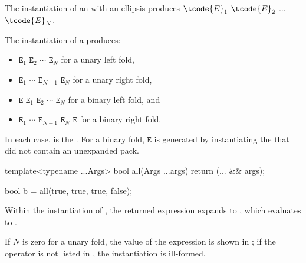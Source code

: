 \pnum
The instantiation of an  with an ellipsis
produces $\tcode{E}_1$ $\tcode{E}_2$ $\dotsc$ $\tcode{E}_N$.

\pnum
The instantiation of a  produces:
\begin{itemize}
\item
\tcode{(}\space
\tcode{((}$\mathtt{E}_1$
            $\mathtt{E}_2$\tcode{)}
            $\cdots$\tcode{)}
            $\mathtt{E}_N$
\space\tcode{)}
for a unary left fold,
\item
\tcode{(}\space
         $\mathtt{E}_1$     
\tcode{(}$\cdots$           
\tcode{(}$\mathtt{E}_{N-1}$ 
         $\mathtt{E}_N$\tcode{))}
\space\tcode{)}
for a unary right fold,
\item
\tcode{(}\space
\tcode{(((}$\mathtt{E}$
             $\mathtt{E}_1$\tcode{)}
             $\mathtt{E}_2$\tcode{)}
             $\cdots$\tcode{)}
             $\mathtt{E}_N$
\space\tcode{)}
for a binary left fold, and
\item
\tcode{(}\space
         $\mathtt{E}_1$     
\tcode{(}$\cdots$           
\tcode{(}$\mathtt{E}_{N-1}$ 
\tcode{(}$\mathtt{E}_{N}$   
         $\mathtt{E}$\tcode{)))}
\space\tcode{)}
for a binary right fold.
\end{itemize}

In each case,
 is the .
For a binary fold,
$\mathtt{E}$ is generated
by instantiating the 
that did not contain an unexpanded pack.
\begin{example}
\begin{codeblock}
template<typename ...Args>
  bool all(Args ...args) { return (... && args); }

bool b = all(true, true, true, false);
\end{codeblock}
Within the instantiation of ,
the returned expression expands to
,
which evaluates to .
\end{example}
If $N$ is zero for a unary fold,
the value of the expression is shown in ;
if the operator is not listed in ,
the instantiation is ill-formed.

